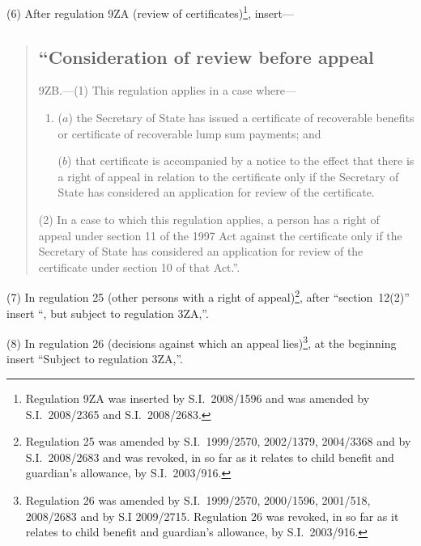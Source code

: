 \documentclass[12pt,a4paper]{article}
\begin{document}
(6) After regulation 9ZA (review of certificates)\footnote{Regulation 9ZA was inserted by S.I.~2008/1596 and was amended by S.I.~2008/2365 and S.I.~2008/2683.}, insert—
\begin{quotation}
\subsection*{“Consideration of review before appeal}

9ZB.---(1)  This regulation applies in a case where—
\begin{enumerate}\item[]
($a$) the Secretary of State has issued a certificate of recoverable benefits or certificate of recoverable lump sum payments; and

($b$) that certificate is accompanied by a notice to the effect that there is a right of appeal in relation to the certificate only if the Secretary of State has considered an application for review of the certificate.
\end{enumerate}

(2) In a case to which this regulation applies, a person has a right of appeal under section 11 of the 1997 Act against the certificate only if the Secretary of State has considered an application for review of the certificate under section 10 of that Act.”.
\end{quotation}

(7) In regulation 25 (other persons with a right of appeal)\footnote{Regulation 25 was amended by S.I.~1999/2570, 2002/1379, 2004/3368 and by S.I.~2008/2683 and was revoked, in so far as it relates to child benefit and guardian’s allowance, by S.I.~2003/916.}, after “section~12(2)” insert “, but subject to regulation 3ZA,”.

(8) In regulation 26 (decisions against which an appeal lies)\footnote{Regulation 26 was amended by S.I.~1999/2570, 2000/1596, 2001/518, 2008/2683 and by S.I 2009/2715. Regulation 26 was revoked, in so far as it relates to child benefit and guardian’s allowance, by S.I.~2003/916.}, at the beginning insert “Subject to regulation 3ZA,”.
\end{document}
